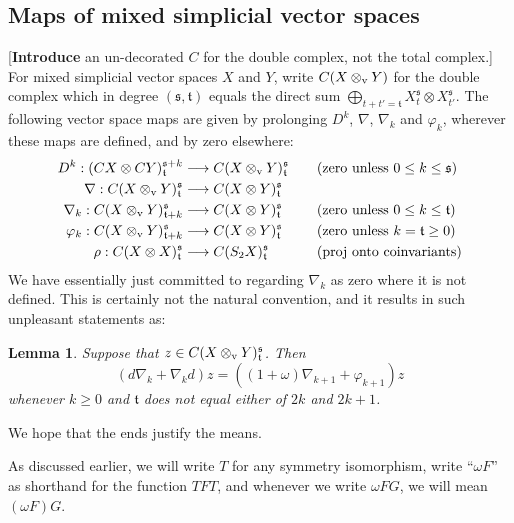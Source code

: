 \documentclass[11pt]{amsart}
\theoremstyle{plain}
\newtheorem{lem}[thm]{Lemma}
\theoremstyle{definition}
\let\phi\varphi
\renewcommand{\to}{\longrightarrow}
\newcommand{\frakt}{\mathfrak{t}}
\newcommand{\fraks}{\mathfrak{s}}
\theoremstyle{plain}
\newcommand{\twist}{\omega}
\newcommand{\Nabla}{\nabla}
\begin{document}
\begin{second quadrant homotopy}
\begin{shaded}
\end{shaded}

\subsection{Maps of mixed simplicial vector spaces}
[\textbf{Introduce} an un-decorated $C$ for the double complex, not the total complex.]
For mixed simplicial vector spaces $X$ and $Y$, write $C(X\otimes_\textup{v}Y)$ for the double complex which in degree $(\fraks,\frakt)$ equals the direct sum $\bigoplus_{t+t'=\frakt}X_t^\fraks\otimes X_{t'}^\fraks$. The following vector space maps are given by prolonging $D^k$, $\Nabla$, $\Nabla_k$ and $\phi_k$, wherever these maps are defined, and by zero elsewhere:
\begin{align*}
{D}^k:(CX\otimes CY)^{\fraks+k}_{\frakt}&\to C(X\otimes_\textup{v}Y)^{\fraks}_{\frakt}&\quad&\textup{(zero unless $0\leq k\leq \fraks$)}\\
{\Nabla}:C(X\otimes_\textup{v} Y)^{\fraks}_{\frakt}&\to C(X\otimes Y)^{\fraks}_{\frakt}\\
{\Nabla}_k:C(X\otimes_\textup{v} Y)^{\fraks}_{\frakt+k}&\to C(X\otimes Y)^{\fraks}_{\frakt}&\quad&\textup{(zero unless $0\leq k\leq \frakt$)}\\
{\phi}_k:C(X\otimes_\textup{v} Y)^{\fraks}_{\frakt+k}&\to C(X\otimes Y)^{\fraks}_{\frakt}&\quad&\textup{(zero unless $k= \frakt\geq0$)}\\
{\rho}:C(X\otimes X)^{\fraks}_{\frakt}&\to C(S_2X)^{\fraks}_{\frakt}&\quad&\textup{(proj onto coinvariants)}
\end{align*}
We have essentially just committed to regarding $\Nabla_k$ as zero where it is not defined. This is certainly not the natural convention, and it results in such unpleasant statements as:
\begin{lem}\label{unpleasant formula}
Suppose that $z\in C(X\otimes_\textup{v} Y)^{\fraks}_{\frakt}$. Then
\[(d\Nabla_k+\Nabla_kd)z=((1+\twist)\Nabla_{k+1}+\phi_{k+1} )z\]
whenever $k\geq0$ and $\frakt$ does not equal either of $2k$ and $2k+1$.
\end{lem}
\noindent We hope that the ends justify the means.

As discussed earlier, we will write $T$ for any symmetry isomorphism, write ``$\twist F$'' as shorthand for the function $TFT$, and  whenever we write $\twist FG$, we will mean $(\twist F)G$.


\end{second quadrant homotopy}
\end{document}

